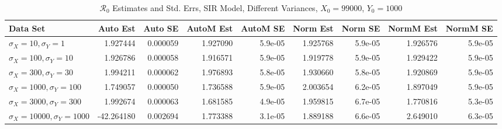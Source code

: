\documentclass[12pt]{article}
\newcommand{\rr}{\ensuremath{\mathcal{R}_0}}
\begin{document}
\begin{table}[H]
	
	\caption{$\rr$ Estimates and Std. Errs, SIR Model, 
		Different Variances, $X_0 = 99000$, $Y_0 = 1000$}
	\begin{footnotesize}
		\hskip -1.7cm
		\begin{tabular}{l|r|r|r|r|r|r|r|r}
			\hline
			Data Set & Auto Est & Auto SE & AutoM Est & AutoM SE & Norm Est & Norm SE & NormM Est & NormM SE\\
			\hline
			$\sigma_X = 10, \sigma_Y = 1$ & 1.927444 & 0.000059 & 1.927090 & 5.9e-05 & 1.925768 & 5.9e-05 & 1.926576 & 5.9e-05\\
			\hline
			$\sigma_X = 100, \sigma_Y = 10$ & 1.926786 & 0.000058 & 1.916571 & 5.9e-05 & 1.919778 & 5.9e-05 & 1.929422 & 5.9e-05\\
			\hline
			$\sigma_X = 300, \sigma_Y = 30$ & 1.994211 & 0.000062 & 1.976893 & 5.8e-05 & 1.930660 & 5.8e-05 & 1.920869 & 5.9e-05\\
			\hline
			$\sigma_X = 1000, \sigma_Y = 100$ & 1.749057 & 0.000050 & 1.736588 & 5.9e-05 & 2.003654 & 6.2e-05 & 1.897049 & 5.9e-05\\
			\hline
			$\sigma_X = 3000, \sigma_Y = 300$ & 1.992674 & 0.000063 & 1.681585 & 4.9e-05 & 1.959815 & 6.7e-05 & 1.770816 & 5.3e-05\\
			\hline
			$\sigma_X = 10000, \sigma_Y = 1000$ & -42.264180 & 0.002694 & 1.773388 & 3.1e-05 & 1.889188 & 6.6e-05 & 2.649010 & 6.3e-05\\
			\hline
		\end{tabular}
	\end{footnotesize}
\end{table}
\end{document}
